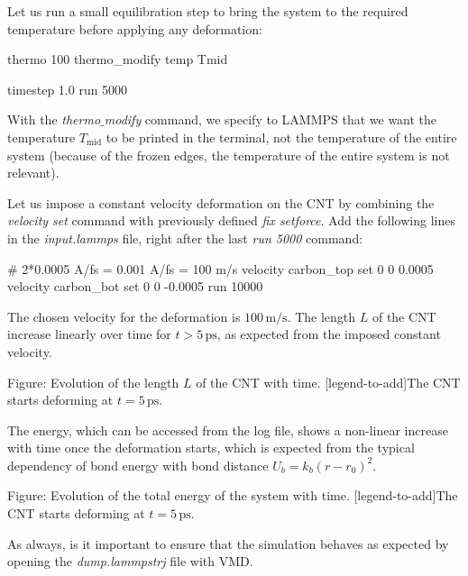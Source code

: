 \noindent Let us run a small equilibration step to bring the system 
to the required temperature before applying any deformation:

\begin{lcverbatim}
thermo 100
thermo_modify temp Tmid

timestep 1.0
run 5000
\end{lcverbatim}

\noindent With the \textit{thermo$\_$modify} command, we specify to LAMMPS that we
want the temperature $T_\mathrm{mid}$ to be printed in
the terminal, not the temperature of the entire system
(because of the frozen edges, the temperature of
the entire system is not relevant).

\vspace{0.25cm} \noindent Let us impose a constant velocity deformation on the CNT by combining
the \textit{velocity set} command with previously defined \textit{fix setforce}. 
Add the following lines in the \textit{input.lammps} file, 
right after the last \textit{run 5000} command:

\begin{lcverbatim}
# 2*0.0005 A/fs = 0.001 A/fs = 100 m/s
velocity carbon_top set 0 0 0.0005
velocity carbon_bot set 0 0 -0.0005
run 10000
\end{lcverbatim}

\noindent The chosen velocity for the deformation is $100\,\text{m/s}$.
The length $L$ of the CNT increase linearly over
time for $t > 5\,\text{ps}$, as expected from the imposed constant velocity.

\vspace{0.25cm} Figure: Evolution of the length $L$ of the CNT with time.
[legend-to-add]The CNT starts deforming at $t = 5\,\text{ps}$.

\vspace{0.25cm} \noindent The energy, which can be accessed from the log file, shows a non-linear
increase with time once the deformation starts,
which is expected from the typical dependency of bond energy with
bond distance $U_b = k_b \left( r - r_0 \right)^2$.

\vspace{0.25cm} Figure: Evolution of the total energy of the system with time.
[legend-to-add]The CNT starts deforming at $t = 5\,\text{ps}$.

\vspace{0.25cm} \noindent As always, is it important to ensure that the simulation
behaves as expected by opening the \textit{dump.lammpstrj} file with VMD.

